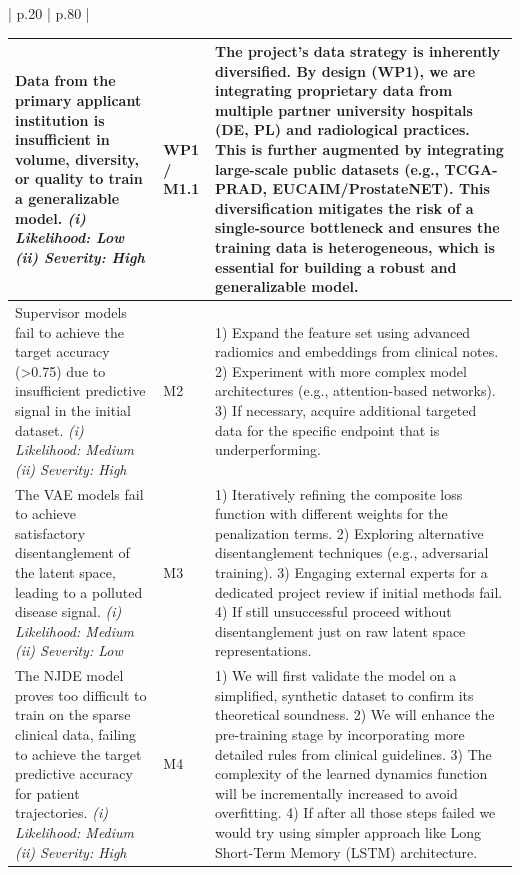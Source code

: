 \documentclass[11pt, a4paper]{article}
\begin{document}
\begin{longtable}{| p{} | p{} |}
\begin{longtable}{|L{0.3\textwidth}|L{0.1\textwidth}|L{0.5\textwidth}|}
Data from the primary applicant institution is insufficient in volume, diversity, or quality to train a generalizable model.
\newline\textit{(i) Likelihood: Low}
\newline\textit{(ii) Severity: High}
& WP1 / M1.1
& The project's data strategy is inherently diversified. By design (WP1), we are integrating proprietary data from multiple partner university hospitals (DE, PL) and radiological practices. This is further augmented by integrating large-scale public datasets (e.g., TCGA-PRAD, EUCAIM/ProstateNET). This diversification mitigates the risk of a single-source bottleneck and ensures the training data is heterogeneous, which is essential for building a robust and generalizable model. \\
\hline

Supervisor models fail to achieve the target accuracy (>0.75) due to insufficient predictive signal in the initial dataset.
\newline\textit{(i) Likelihood: Medium}
\newline\textit{(ii) Severity: High}
& M2
& 1) Expand the feature set using advanced radiomics and embeddings from clinical notes. 2) Experiment with more complex model architectures (e.g., attention-based networks). 3) If necessary, acquire additional targeted data for the specific endpoint that is underperforming. \\
\hline

The VAE models fail to achieve satisfactory disentanglement of the latent space, leading to a polluted disease signal.
\newline\textit{(i) Likelihood: Medium}
\newline\textit{(ii) Severity: Low}
& M3
& 1) Iteratively refining the composite loss function with different weights for the penalization terms. 2) Exploring alternative disentanglement techniques (e.g., adversarial training). 3) Engaging external experts for a dedicated project review if initial methods fail. 4) If still unsuccessful proceed without disentanglement just on raw latent space representations. \\
\hline

The NJDE model proves too difficult to train on the sparse clinical data, failing to achieve the target predictive accuracy for patient trajectories.
\newline\textit{(i) Likelihood: Medium}
\newline\textit{(ii) Severity: High}
& M4
& 1) We will first validate the model on a simplified, synthetic dataset to confirm its theoretical soundness. 2) We will enhance the pre-training stage by incorporating more detailed rules from clinical guidelines. 3) The complexity of the learned dynamics function will be incrementally increased to avoid overfitting. 4) If after all those steps failed we would try using simpler approach like Long Short-Term Memory (LSTM) architecture. \\
\hline


\end{longtable}
\end{longtable}
\end{document}
